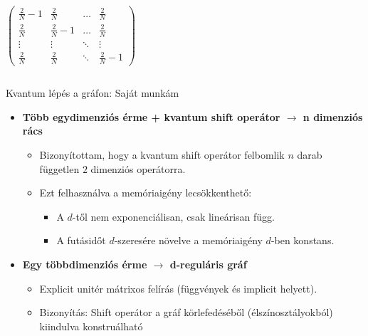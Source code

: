 \documentclass[aspectratio=169]{beamer}
\begin{document}
\begin{frame}
\begin{columns}[t,onlytextwidth]
\begin{column}{.5\textwidth}
\begin{center}
        \addvspace{10pt}
        
$
\begin{pmatrix}
      \frac{2}{N} - 1 & \frac{2}{N} & \dots  & \frac{2}{N} \\
      \frac{2}{N} & \frac{2}{N} - 1 & \dots  & \frac{2}{N} \\
      \vdots & \vdots & \ddots & \vdots \\
      \frac{2}{N} & \frac{2}{N} & \ddots & \frac{2}{N} - 1
    \end{pmatrix}
$


      \end{center}
    \end{column}
  \end{columns}
\end{frame}


\begin{frame}{Kvantum lépés a gráfon: Saját munkám}
\begin{itemize}
    \item \textbf{Több egydimenziós érme + kvantum shift operátor $\rightarrow$ n dimenziós rács}
    \begin{itemize}
        \item Bizonyítottam, hogy a kvantum shift operátor felbomlik $n$ darab független $2$ dimenziós operátorra.
        \item Ezt felhasználva a memóriaigény lecsökkenthető:
        \begin{itemize}
            \item A $d$-től nem exponenciálisan, csak lineárisan függ.
            \item A futásidőt $d$-szeresére növelve a memóriaigény $d$-ben konstans.
        \end{itemize}
    \end{itemize}
    \item \textbf{Egy többdimenziós érme $\rightarrow$ d-reguláris gráf}
    \begin{itemize}
        \item Explicit unitér mátrixos felírás (függvények és implicit helyett).
        \item Bizonyítás: Shift operátor a gráf körlefedéséből (élszínosztályokból) kiindulva konstruálható
    \end{itemize}
\end{itemize}
\end{frame}
\end{document}
